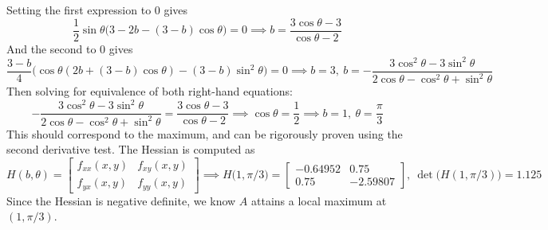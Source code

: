 \documentclass{article}
\begin{document}
Setting the first expression to 0 gives
$$ \frac{1}{2} \sin \theta \big(3 - 2b - (3-b)\cos \theta) = 0 \implies b = \frac{3 \cos \theta  - 3}{\cos \theta - 2}$$
And the second to 0 gives 
$$  \frac{3-b}{4} \big (\cos \theta (2b + (3-b)\cos \theta ) - (3-b) \sin^2 \theta \big) =0  \implies b = 3, \ b = -\frac{3\cos^2 \theta - 3 \sin^2 \theta}{2 \cos \theta 	- \cos^2 \theta + \sin ^2 \theta}$$
Then solving for equivalence of both right-hand equations:
$$ -\frac{3\cos^2 \theta - 3 \sin^2 \theta}{2 \cos \theta 	- \cos^2 \theta + \sin ^2 \theta} = \frac{3 \cos \theta  - 3}{\cos \theta - 2} \implies \cos \theta = \frac{1}{2} \implies b = 1,  \ \theta = \frac{\pi}{3} $$
This should correspond to the maximum, and can be rigorously proven using the second derivative test. The Hessian is computed as
$$ H(b,\theta) = \begin{bmatrix} f_{xx}(x,y) & f_{xy}(x,y)\\ f_{yx}(x,y) & f_{yy}(x,y) \end{bmatrix} \implies H \big( 1, \pi/3 \big) = \begin{bmatrix} -0.64952 & 0.75 \\ 0.75 & -2.59807 \end{bmatrix}, \ \det \big( H(1, \pi/3) \big)=1.125$$ 
Since the Hessian is negative definite, we know $A$ attains a local maximum at $(1, \pi/3)$. 

\newpage 
\end{document}
